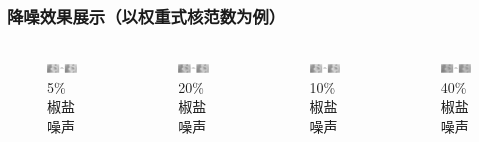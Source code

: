 \documentclass[10pt,aspectratio=43,mathserif]{beamer}
\begin{document}
\begin{frame}
\frametitle{\textbf{降噪效果展示（以权重式核范数为例）}}
\begin{columns}
\begin{figure}
\centering
\includegraphics[scale=0.25]{Screenshot_5.png}
\caption{5\%椒盐噪声}
\end{figure}

\begin{figure}
\centering
\includegraphics[scale=0.25]{Screenshot_7.png}
\caption{20\%椒盐噪声}
\end{figure}

\begin{figure}
\centering
\includegraphics[scale=0.25]{Screenshot_6.png}
\caption{10\%椒盐噪声}
\end{figure}

\begin{figure}
\centering
\includegraphics[scale=0.25]{Screenshot_8.png}
\caption{40\%椒盐噪声}
\end{figure}
	
\end{columns}
\end{frame}
\end{document}
